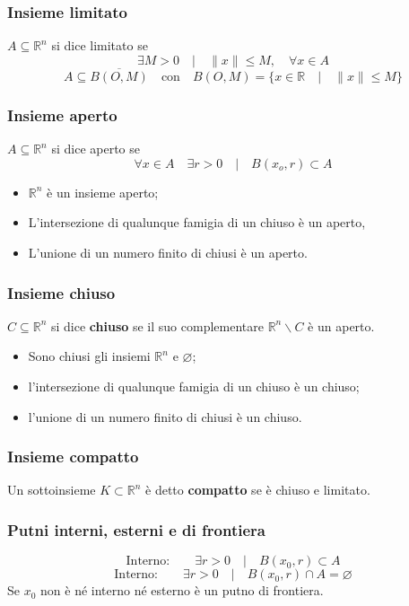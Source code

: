\documentclass[x11names]{article}
\begin{document}
	\subsubsection*{Insieme limitato}
	\(A \subseteq \mathbb{R}^n\) si dice limitato se
	\[ 
	\exists M > 0 \quad | \quad \|x\| \leq M, \quad \forall x \in A
	\]
	\[ 
	A \subseteq \overline{B(O,M)} \quad \text{con} \quad B(O,M) = \{x \in \mathbb{R} \quad | \quad \|x\|\leq M \}
	\]
	\subsubsection*{Insieme aperto}
	\(A\subseteq \mathbb{R}^n\) si dice aperto se 
	\[ 
	\forall x \in A \quad \exists r > 0 \quad | \quad B(x_{o},r) \subset A
	\]
	\begin{itemize}
		\item	\(\mathbb{R}^n\) è un insieme aperto;
		\item   L'intersezione di qualunque famigia di un chiuso è un aperto,
		\item   L'unione di un numero finito di chiusi è un aperto.
	\end{itemize}
	
	\subsubsection*{Insieme chiuso}
	\(C\subseteq \mathbb{R}^n\) si dice \textbf{chiuso} se il suo complementare \(\mathbb{R}^n \backslash C\) è un aperto.
	
	\begin{itemize}
		\item	Sono chiusi gli insiemi \(\mathbb{R}^n\) e \(\varnothing\);
		\item  l'intersezione di qualunque famigia di un chiuso è un chiuso;
		\item   l'unione di un numero finito di chiusi è un chiuso.
	\end{itemize}
	
	
	\subsubsection*{Insieme compatto}
	Un sottoinsieme \(K\subset \mathbb{R}^n\) è detto \textbf{compatto} se è chiuso e limitato.
	
	\subsubsection*{Putni interni, esterni e di frontiera}
	\[ 
	\text{Interno:} \qquad \exists r > 0 \quad | \quad B(x_{0}, r) \subset A
	\]
	\[ 
	\text{Interno:} \qquad \exists r > 0 \quad | \quad B(x_{0}, r) \cap A = \varnothing
	\]
	Se \(x_{0}\) non è né interno né esterno è un putno di frontiera.
	
\end{document}
